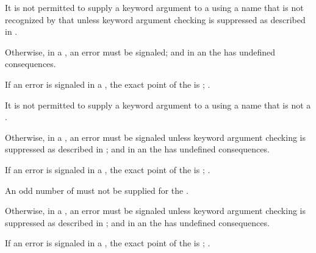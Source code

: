 It is not permitted to supply a keyword argument to a 
using a name that is not recognized by that  
unless keyword argument checking is suppressed as described
in \secref\SuppressingKeyArgChecks.

Otherwise, in a , an error  must be signaled;
and in an  the  has undefined consequences.

If an error is signaled in a ,
the exact point of the  is ;
\seesection\SafeCallDetectionTime.

\endsubsubsection%

It is not permitted to supply a keyword argument to a 
using a name that is not a .

Otherwise, in a , an error  must be signaled 
unless keyword argument checking is suppressed as described
in \secref\SuppressingKeyArgChecks;
and in an  the  has undefined consequences.

If an error is signaled in a ,
the exact point of the  is ;
\seesection\SafeCallDetectionTime.

\endsubsubsection%


An odd number of  must not be supplied for the .

Otherwise, in a ,
an error  must be signaled
unless keyword argument checking is suppressed as described
in \secref\SuppressingKeyArgChecks;
and in an  the  has undefined consequences.

If an error is signaled in a ,
the exact point of the  is ;
\seesection\SafeCallDetectionTime.


\endsubsubsection%

